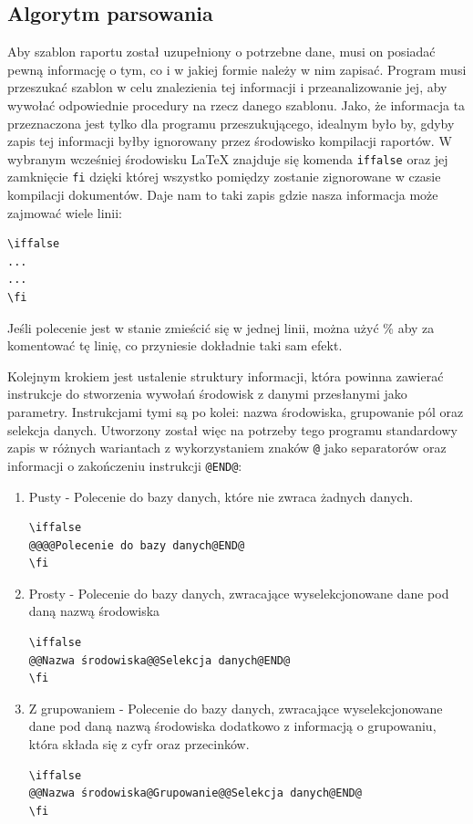 \subsection{Algorytm parsowania}
Aby szablon raportu został uzupełniony o potrzebne dane, musi on posiadać pewną informację o tym, co i w jakiej formie należy w nim zapisać.  Program musi przeszukać szablon w celu znalezienia tej informacji i przeanalizowanie jej, aby wywołać odpowiednie procedury na rzecz danego szablonu. Jako, że informacja ta przeznaczona jest tylko dla programu przeszukującego, idealnym było by, gdyby zapis tej informacji byłby ignorowany przez środowisko kompilacji raportów.  W wybranym wcześniej środowisku LaTeX znajduje się komenda \texttt{iffalse} oraz jej zamknięcie \texttt{fi} dzięki której wszystko pomiędzy zostanie zignorowane w czasie kompilacji dokumentów. Daje nam to taki zapis gdzie nasza informacja może zajmować wiele linii:
\begin{lstlisting}
\iffalse 
...
...
\fi
\end{lstlisting}
Jeśli polecenie jest w stanie zmieścić się w jednej linii, można użyć \% aby za komentować tę linię, co przyniesie dokładnie taki sam efekt.
\par
Kolejnym krokiem jest ustalenie struktury informacji, która powinna zawierać instrukcje do stworzenia wywołań środowisk z danymi przesłanymi jako parametry. Instrukcjami tymi są po kolei: nazwa środowiska, grupowanie pól oraz selekcja danych. Utworzony został więc na potrzeby tego programu standardowy zapis w różnych wariantach z wykorzystaniem znaków \texttt{@} jako separatorów oraz informacji o zakończeniu instrukcji \texttt{@END@}:\vspace{5mm}
\begin{enumerate}
\item Pusty - Polecenie do bazy danych, które nie zwraca żadnych danych.
\begin{lstlisting}
\iffalse 
@@@@Polecenie do bazy danych@END@
\fi
\end{lstlisting}

\item Prosty - Polecenie do bazy danych, zwracające wyselekcjonowane dane pod daną nazwą środowiska
\begin{lstlisting}
\iffalse 
@@Nazwa środowiska@@Selekcja danych@END@
\fi
\end{lstlisting}

\item Z grupowaniem - Polecenie do bazy danych, zwracające wyselekcjonowane dane pod daną nazwą środowiska dodatkowo z informacją o grupowaniu, która składa się z cyfr oraz przecinków.
\begin{lstlisting}
\iffalse 
@@Nazwa środowiska@Grupowanie@@Selekcja danych@END@
\fi
\end{lstlisting}
\end{enumerate}

